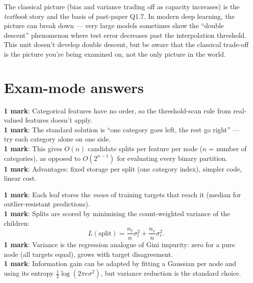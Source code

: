 \documentclass[11pt, a4paper]{article}
\begin{document}
\begin{pitfallbox}
The classical picture (bias and variance trading off as capacity increases) is the \emph{textbook} story and the basis of past-paper Q1.7. In modern deep learning, the picture can break down — very large models sometimes show the ``double descent'' phenomenon where test error decreases past the interpolation threshold. This unit doesn't develop double descent, but be aware that the classical trade-off is the picture you're being examined on, not the only picture in the world.
\end{pitfallbox}

\section*{Exam-mode answers}

\begin{exambox}
\textbf{1 mark}: Categorical features have no order, so the threshold-scan rule from real-valued features doesn't apply. \\
\textbf{1 mark}: The standard solution is ``one category goes left, the rest go right'' — try each category alone on one side. \\
\textbf{1 mark}: This gives $O(n)$ candidate splits per feature per node ($n$ = number of categories), as opposed to $O(2^{n-1})$ for evaluating every binary partition. \\
\textbf{1 mark}: Advantages: fixed storage per split (one category index), simpler code, linear cost.
\end{exambox}

\begin{exambox}
\textbf{1 mark}: Each leaf stores the \emph{mean} of training targets that reach it (median for outlier-resistant predictions). \\
\textbf{1 mark}: Splits are scored by minimising the count-weighted variance of the children:
\[
L(\text{split}) = \frac{n_l}{n} \sigma_l^2 + \frac{n_r}{n}\sigma_r^2.
\]
\textbf{1 mark}: Variance is the regression analogue of Gini impurity: zero for a pure node (all targets equal), grows with target disagreement. \\
\textbf{1 mark}: Information gain can be adapted by fitting a Gaussian per node and using its entropy $\tfrac{1}{2}\log(2\pi e \sigma^2)$, but variance reduction is the standard choice.
\end{exambox}
\end{document}
